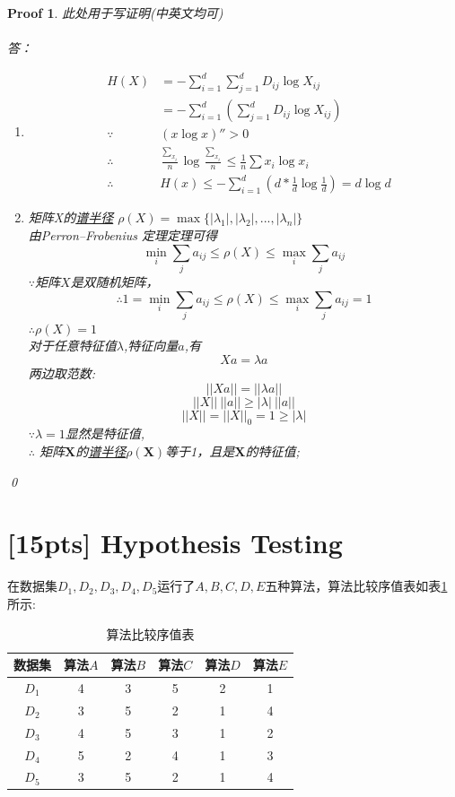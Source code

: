 \documentclass[a4paper,UTF8]{article}
\numberwithin{equation}{section}
\newtheorem*{myProof}{Proof}
\begin{document}
\begin{myProof}
此处用于写证明(中英文均可)
~\\
~\\
答：\\
\begin{enumerate}[ {(}1{)}]
\item
\begin{eqnarray*}
	&H(X)&= -\sum_{i=1}^{d}\sum_{j=1}^{d}{D_{ij}\log{X_{ij}}}\\
		 &&= -\sum_{i=1}^{d}(\sum_{j=1}^{d}{D_{ij}\log{X_{ij}}})\\
	&\because &(x\log{x})'' > 0\\
	&\therefore &{\frac{\sum_{x_i}}{n}}\log{{\frac{\sum_{x_i}}{n}}} 
				\leq \frac{1}{n}\sum{x_i\log{x_i}}\\
	&\therefore &H(x) \leq -\sum_{i=1}^{d}
	{(d*\frac{1}{d}\log{\frac{1}{d}})}=d\log{d}
\end{eqnarray*}
\item
矩阵X的\href{https://en.wikipedia.org/wiki/Spectral_radius}{谱半径}
$\rho(X)=\max{\{|\lambda_1|,|\lambda_2|,...,|\lambda_n|}\}$
\\
由Perron–Frobenius 定理定理可得
\[
	\min_i{\sum_j{a_{ij}}} 
	\leq \rho(X) 
	\leq \max_i{\sum_j{a_{ij}}}
\]
$\because$矩阵$X$是双随机矩阵，\\
\[
	\therefore 1 = \min_i{\sum_j{a_{ij}}} 
	\leq \rho(X) 
	\leq \max_i{\sum_j{a_{ij}}} = 1
\]
$\therefore \rho(X)=1$\\
对于任意特征值$\lambda$,特征向量$a$,有
\[Xa=\lambda a\]
两边取范数:
\[||Xa||=||\lambda a||\]
\[||X||~||a|| \geq |\lambda|~||a||\]
\[ ||X||=||X||_0 = 1 \geq |\lambda|\]
$\because \lambda = 1$显然是特征值,\\
$\therefore$ 矩阵$\mathbf{X}$的\href{https://en.wikipedia.org/wiki/Spectral_radius}{谱半径}$\rho(\mathbf{X})$等于1，且是$\mathbf{X}$的特征值;
\end{enumerate}

\qed
\end{myProof}
\newpage
\section{[15pts] Hypothesis Testing} 
在数据集$D_1,D_2,D_3,D_4,D_5$运行了$A,B,C,D,E$五种算法，算法比较序值表如表\ref{table:ranking}所示:
\begin{table}[h]
\centering
\caption{算法比较序值表} \vspace{2mm}
\label{table:ranking}
\begin{tabular}{c|c c c c c}\hline
数据集 		& 算法$A$  	&算法$B$  	& 算法$C$ 	& 算法$D$  	&算法$E$ 	\\ \hline
$D_1$ 		& 4 		&  3  		& 5  		&  2 		& 1			\\
$D_2$ 		& 3 		&  5  		& 2  		&  1 		& 4			\\
$D_3$ 		& 4 		&  5  		& 3  		&  1 		& 2			\\ 
$D_4$ 		& 5 		&  2  		& 4  		&  1 		& 3			\\ 
$D_5$ 		& 3 		&  5  		& 2  		&  1 		& 4			\\ \hline
\end{tabular}
\end{table}
\end{document}

